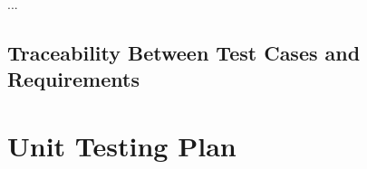 \documentclass[12pt, titlepage]{article}
\begin{document}
...

\subsection{Traceability Between Test Cases and Requirements}


		



					
					
					
					
					

					
					
					
					



				
\section{Unit Testing Plan}
		
\end{document}
